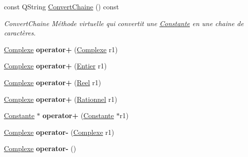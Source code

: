 \begin{DoxyCompactItemize}
\item 
const Q\-String \hyperlink{class_calcul_1_1_complexe_a3f444d3a18104aeb6f1490c0d3a57e6d}{Convert\-Chaine} () const 
\begin{DoxyCompactList}\small\item\em Convert\-Chaine Méthode virtuelle qui convertit une \hyperlink{class_calcul_1_1_constante}{Constante} en une chaine de caractères. \end{DoxyCompactList}\item 
\hypertarget{class_calcul_1_1_complexe_ac94d8bd297d11ca9c6be59ff1de8fbe3}{\hyperlink{class_calcul_1_1_complexe}{Complexe} {\bfseries operator+} (\hyperlink{class_calcul_1_1_complexe}{Complexe} r1)}\label{class_calcul_1_1_complexe_ac94d8bd297d11ca9c6be59ff1de8fbe3}

\item 
\hypertarget{class_calcul_1_1_complexe_a492d158468de2f7f221957781e4626a7}{\hyperlink{class_calcul_1_1_complexe}{Complexe} {\bfseries operator+} (\hyperlink{class_calcul_1_1_entier}{Entier} r1)}\label{class_calcul_1_1_complexe_a492d158468de2f7f221957781e4626a7}

\item 
\hypertarget{class_calcul_1_1_complexe_aad76bb715ecea3ce33eeab06ec3d7440}{\hyperlink{class_calcul_1_1_complexe}{Complexe} {\bfseries operator+} (\hyperlink{class_calcul_1_1_reel}{Reel} r1)}\label{class_calcul_1_1_complexe_aad76bb715ecea3ce33eeab06ec3d7440}

\item 
\hypertarget{class_calcul_1_1_complexe_adfeffbd2a63dfc4b49647ddc92bc9282}{\hyperlink{class_calcul_1_1_complexe}{Complexe} {\bfseries operator+} (\hyperlink{class_calcul_1_1_rationnel}{Rationnel} r1)}\label{class_calcul_1_1_complexe_adfeffbd2a63dfc4b49647ddc92bc9282}

\item 
\hypertarget{class_calcul_1_1_complexe_aa0902e9e1ca9fbc3b180ecc327bf793b}{\hyperlink{class_calcul_1_1_constante}{Constante} $\ast$ {\bfseries operator+} (\hyperlink{class_calcul_1_1_constante}{Constante} $\ast$r1)}\label{class_calcul_1_1_complexe_aa0902e9e1ca9fbc3b180ecc327bf793b}

\item 
\hypertarget{class_calcul_1_1_complexe_a8693b425a124816514a4d8eeded47f98}{\hyperlink{class_calcul_1_1_complexe}{Complexe} {\bfseries operator-\/} (\hyperlink{class_calcul_1_1_complexe}{Complexe} r1)}\label{class_calcul_1_1_complexe_a8693b425a124816514a4d8eeded47f98}

\item 
\hypertarget{class_calcul_1_1_complexe_aa10f5be965f69957eaf7096f99999d53}{\hyperlink{class_calcul_1_1_complexe}{Complexe} {\bfseries operator-\/} ()}\label{class_calcul_1_1_complexe_aa10f5be965f69957eaf7096f99999d53}


\end{DoxyCompactItemize}
